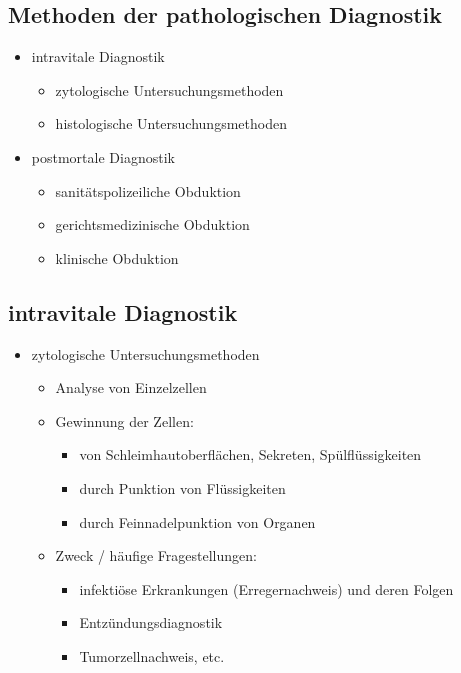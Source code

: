 \subsection{Methoden der pathologischen Diagnostik}
	\begin{itemize}
		\item intravitale Diagnostik
			\begin{itemize}
				\item zytologische Untersuchungsmethoden
				\item histologische Untersuchungsmethoden
			\end{itemize}
		\item postmortale Diagnostik
			\begin{itemize}
				\item sanitätspolizeiliche Obduktion
				\item gerichtsmedizinische Obduktion
				\item klinische Obduktion
			\end{itemize}
	\end{itemize}

\subsection{intravitale Diagnostik}
	\begin{itemize}
		\item zytologische Untersuchungsmethoden
			\begin{itemize}
				\item Analyse von Einzelzellen
				\item Gewinnung der Zellen:
					\begin{itemize}
						\item von Schleimhautoberflächen, Sekreten, Spülflüssigkeiten
						\item durch Punktion von Flüssigkeiten
						\item durch Feinnadelpunktion von Organen
					\end{itemize}
				\item Zweck / häufige Fragestellungen:
					\begin{itemize}
						\item infektiöse Erkrankungen (Erregernachweis) und deren Folgen
						\item Entzündungsdiagnostik
						\item Tumorzellnachweis, etc.
					\end{itemize}
			\end{itemize}
	\end{itemize}


